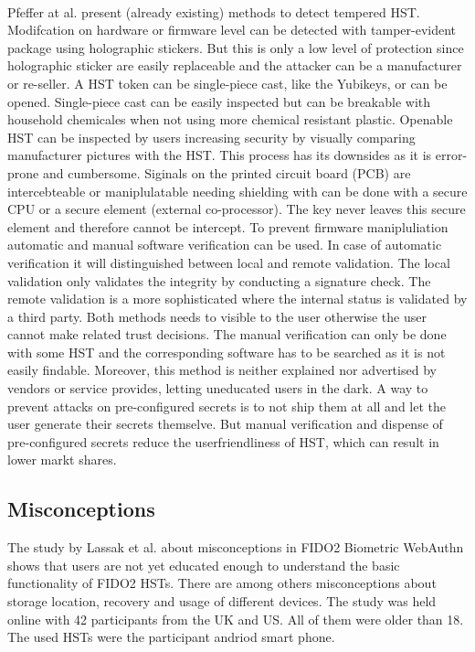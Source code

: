\documentclass[runningheads]{llncs}
\begin{document}
\paragraph{}
Pfeffer at al. present (already existing) methods to detect tempered HST.
Modifcation on hardware or firmware level can be detected with tamper-evident package using holographic stickers. But this is only a low level of protection since holographic sticker are easily replaceable and the attacker can be a manufacturer or re-seller. A HST token can be single-piece cast, like the Yubikeys, or can be opened. Single-piece cast can be easily inspected but can be breakable with household chemicales when not using more chemical resistant plastic. Openable HST can be inspected by users increasing security by visually comparing manufacturer pictures with the HST. This process has its downsides as it is error-prone and cumbersome. Siginals on the printed circuit board (PCB) are intercebteable or maniplulatable needing shielding with can be done with a secure CPU or a secure element (external co-processor). The key never leaves this secure element and therefore cannot be intercept. To prevent firmware manipluliation automatic and manual software verification can be used. In case of automatic verification it will distinguished between local and remote validation. The local validation only validates the integrity by conducting a signature check. The remote validation is a more sophisticated where the internal status is validated by a third party. Both methods needs to visible to the user otherwise the user cannot make related trust decisions.
The manual verification can only be done with some HST and the corresponding software has to be searched as it is not easily findable. Moreover, this method is neither explained nor advertised by vendors or service provides, letting uneducated users in the dark. A way to prevent attacks on pre-configured secrets is to not ship them at all and let the user generate their secrets themselve. But manual verification and dispense of pre-configured secrets reduce the userfriendliness of HST, which can result in lower markt shares. \cite{272198}

\subsection{Misconceptions}
The study by Lassak et al.\cite{274547} about misconceptions in FIDO2 Biometric WebAuthn shows that users are not yet educated enough to understand the basic functionality of FIDO2 HSTs. There are among others misconceptions about storage location, recovery and usage of different devices. The study was held online with 42 participants from the UK and US. All of them were older than 18. The used HSTs were the participant andriod smart phone.
\end{document}
